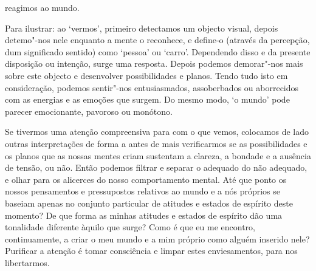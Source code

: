 reagimos ao mundo.

Para ilustrar: ao `vermos', primeiro detectamos um objecto visual, depois
detemo"-nos nele enquanto a mente o reconhece, e define-o (através da percepção,
dum significado sentido) como `pessoa' ou `carro'. Dependendo disso e da
presente disposição ou intenção, surge uma resposta. Depois podemos demorar"-nos
mais sobre este objecto e desenvolver possibilidades e planos. Tendo tudo isto
em consideração, podemos sentir"-nos entusiasmados, assoberbados ou aborrecidos
com as energias e as emoções que surgem. Do mesmo modo, `o mundo' pode parecer
emocionante, pavoroso ou monótono.

Se tivermos uma atenção compreensiva para com o que vemos, colocamos de lado
outras interpretações de forma a antes de mais verificarmos se as possibilidades
e os planos que as nossas mentes criam sustentam a clareza, a bondade e a
ausência de tensão, ou não. Então podemos filtrar e separar o adequado do não
adequado, e olhar para os alicerces do nosso comportamento mental. Até que ponto
os nossos pensamentos e pressupostos relativos ao mundo e a nós próprios se
baseiam apenas no conjunto particular de atitudes e estados de espírito deste
momento? De que forma as minhas atitudes e estados de espírito dão uma
tonalidade diferente àquilo que surge? Como é que eu me encontro, continuamente,
a criar o meu mundo e a mim próprio como alguém inserido nele? Purificar a
atenção é tomar consciência e limpar estes enviesamentos, para nos libertarmos.

